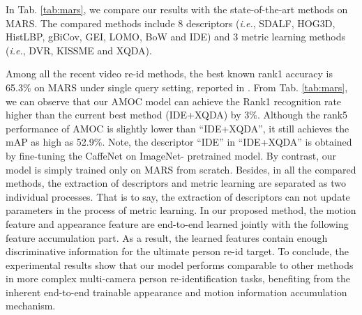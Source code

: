 \documentclass[journal]{IEEEtran}
\begin{document}
In Tab. \ref{tab:mars}, we compare our results with the state-of-the-art methods on MARS. The compared methods include 8 descriptors (\textit{i.e.}, SDALF, HOG3D, HistLBP, gBiCov, GEI, LOMO, BoW and IDE) and 3 metric learning methods (\textit{i.e.}, DVR, KISSME and XQDA).    

Among all the recent video re-id methods, the best known rank1 accuracy is 65.3\% on MARS under single query setting, reported in \cite{zheng2016mars}. From Tab. \ref{tab:mars}, we can observe that our AMOC model can achieve the Rank1 recognition rate higher than the current best method (IDE\cite{zheng2016person}+XQDA) by 3\%. Although the rank5 performance of AMOC is slightly lower than ``IDE+XQDA'', it still achieves the mAP as high as 52.9\%. Note, the descriptor ``IDE'' in ``IDE+XQDA'' is obtained by fine-tuning the CaffeNet\cite{Krizhevsky2012ImageNet} on ImageNet- pretrained model. By contrast, our model is simply trained only on MARS from scratch. Besides, in all the compared methods, the extraction of descriptors and metric learning are separated as two individual processes. That is to say, the extraction of descriptors can not update parameters in the process of metric learning. In our proposed method, the motion feature and appearance feature are end-to-end learned jointly with the following feature accumulation part. As a result, the learned features contain enough discriminative information for the ultimate person re-id target.  To conclude, the experimental results show that our model performs comparable to other methods in more complex multi-camera person re-identification tasks, benefiting from the inherent end-to-end trainable appearance and motion information accumulation mechanism.
\end{document}
